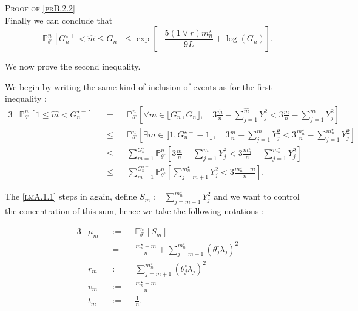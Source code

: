 \begin{pro}{\textsc{Proof of \textsc{\cref{prB.2.2}}} \\}
Finally we can conclude that
\[\mathds{P}_{\theta^{\circ}}^{n}\left[G_{n}^{\star+} < \widehat{m} \leq G_{n}\right] \leq \exp\left[- \frac{5 \left( 1 \vee r\right) m_{n}^{\star}}{9 L} + \log\left(G_{n}\right)\right].\]

\bigskip

We now prove the second inequality.

We begin by writing the same kind of inclusion of events as for the first inequality :
\begin{alignat*}{3}
& \mathds{P}_{\theta^{\circ}}^{n} \left[1 \leq \widehat{m} < G_{n}^{\star-}\right] && = && \mathds{P}_{\theta^{\circ}}^{n} \left[ \forall m \in \llbracket G_{n}^{-}, G_{n} \rrbracket, \quad 3 \frac{\widehat{m}}{n} - \sum\limits_{j = 1}^{\widehat{m}} Y_{j}^{2} < 3 \frac{m}{n} - \sum\limits_{j = 1}^{m} Y_{j}^{2}\right]\\
& && \leq && \mathds{P}_{\theta^{\circ}}^{n} \left[ \exists m \in \llbracket 1, G_{n}^{\star-} -1 \rrbracket, \quad 3 \frac{m}{n} - \sum\limits_{j = 1}^{m} Y_{j}^{2} < 3 \frac{m_{n}^{\star}}{n} - \sum\limits_{j = 1}^{m_{n}^{\star}} Y_{j}^{2}\right]\\
& && \leq && \sum\limits_{m = 1}^{G_{n}^{\star-}} \mathds{P}_{\theta^{\circ}}^{n} \left[3 \frac{m}{n} - \sum\limits_{j = 1}^{m} Y_{j}^{2} < 3 \frac{m_{n}^{\star}}{n} - \sum\limits_{j = 1}^{m_{n}^{\star}} Y_{j}^{2}\right]\\
& && \leq && \sum\limits_{m = 1}^{G_{n}^{\star-}} \mathds{P}_{\theta^{\circ}}^{n}\left[\sum\limits_{j = m + 1}^{m_{n}^{\star}} Y_{j}^{2} < 3 \frac{m_{n}^{\star} - m}{n} \right].
\end{alignat*}

The \textsc{\cref{lmA.1.1}} steps in again, define $S_{m} := \sum\limits_{j = m + 1}^{m_{n}^{\star}} Y_{j}^{2}$ and we want to control the concentration of this sum, hence we take the following notations :

\begin{alignat*}{3}
& \mu_{m} && := && \mathds{E}_{\theta^{\circ}}^{n}\left[S_{m}\right]\\
& && = && \frac{m_{n}^{\star} - m}{n} + \sum\limits_{j = m+1}^{m_{n}^{\star}}\left(\theta^{\circ}_{j}\lambda_{j}\right)^{2}\\
& r_{m} && := && \sum\limits_{j = m+1}^{m_{n}^{\star}}\left(\theta^{\circ}_{j}\lambda_{j}\right)^{2}\\
& v_{m} && := && \frac{m_{n}^{\star} - m}{n}\\
& t_{m} && := && \frac{1}{n}.
\end{alignat*}


\end{pro}
